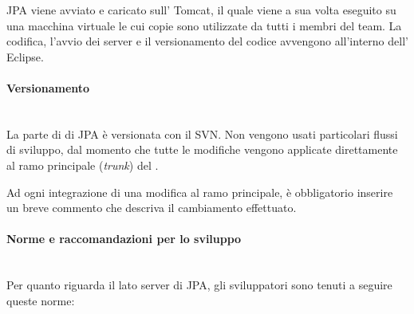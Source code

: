 JPA viene avviato e caricato sull' Tomcat, il quale
viene a sua volta eseguito su una macchina virtuale le cui copie sono
utilizzate da tutti i membri del team.
La codifica, l'avvio dei server e il versionamento del codice avvengono
all'interno dell' Eclipse.

\paragraph{Versionamento} \mbox{} \\

La parte di \BKEND{} di JPA è versionata con il  SVN. Non vengono usati
particolari flussi di sviluppo, dal momento che tutte le modifiche vengono
applicate direttamente al ramo principale (\emph{trunk}) del
.

Ad ogni integrazione di una modifica al ramo principale, è obbligatorio
inserire un breve commento che descriva il cambiamento effettuato.

\paragraph{Norme e raccomandazioni per lo sviluppo} \mbox{} \\

Per quanto riguarda il lato server di JPA, gli sviluppatori sono tenuti a
seguire queste norme:

